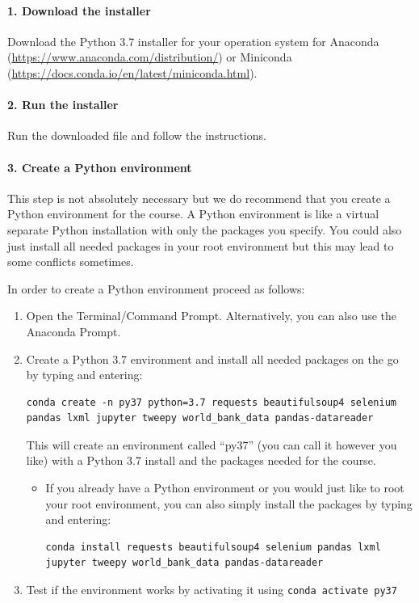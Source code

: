\documentclass[a4paper]{article}
\begin{document}
\paragraph{1. Download the installer} Download the Python 3.7 installer for your operation system for Anaconda (\url{https://www.anaconda.com/distribution/}) or Miniconda (\url{https://docs.conda.io/en/latest/miniconda.html}).

\paragraph{2. Run the installer} Run the downloaded file and follow the instructions.

\paragraph{3. Create a Python environment} This step is not absolutely necessary but we do recommend that you create a Python environment for the course. A Python environment is like a virtual separate Python installation with only the packages you specify. You could also just install all needed packages in your root environment but this may lead to some conflicts sometimes.
\pagebreak{}

In order to create a Python environment proceed as follows:
\begin{enumerate}
	\item Open the Terminal/Command Prompt. Alternatively, you can also use the Anaconda Prompt.
	\item Create a Python 3.7 environment and install all needed packages on the go by typing and entering:
\begin{verbatim}
conda create -n py37 python=3.7 requests beautifulsoup4 selenium pandas lxml jupyter tweepy world_bank_data pandas-datareader
\end{verbatim}
        This will create an environment called ``py37'' (you can call it however you like) with a Python 3.7 install and the packages needed for the course.
	\begin{itemize}
		\item If you already have a Python environment or you would just like to root your root environment, you can also simply install the packages by typing and entering:
\begin{verbatim}
conda install requests beautifulsoup4 selenium pandas lxml jupyter tweepy world_bank_data pandas-datareader
\end{verbatim}
	\end{itemize}
	\item Test if the environment works by activating it using \texttt{conda activate py37}
\end{enumerate}
\end{document}
